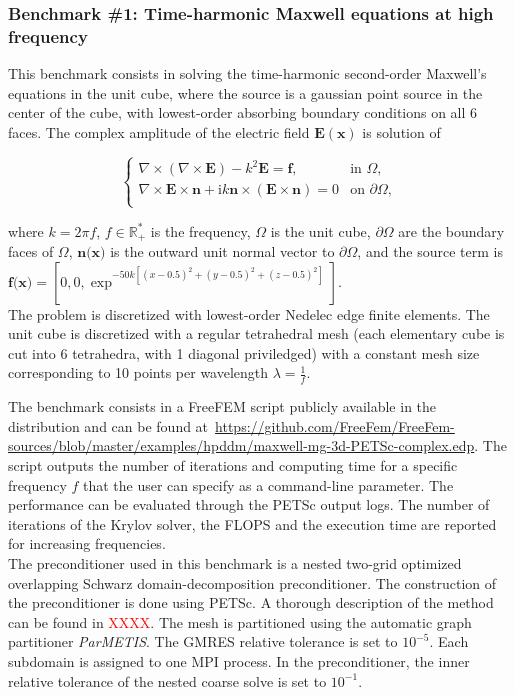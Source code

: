\subsubsection{Benchmark \#1: Time-harmonic Maxwell equations at high frequency}

This benchmark consists in solving the time-harmonic second-order Maxwell's equations in the unit cube, where the source is a gaussian point source in the center of the cube, with lowest-order absorbing boundary conditions on all 6 faces. The complex amplitude of the electric field $\mathbf{E(x)}$ is solution of

\begin{equation}
  \begin{cases}
\nabla\times(\nabla\times \mathbf{E})- k^2 \mathbf{E} = \mathbf{f}, & \text{in } \Omega,\\
\nabla\times \mathbf{E}\times \textbf{n}+ \mathrm{i} k \textbf{n} \times (\mathbf{E}\times \textbf{n}) = 0 & \text{on } \partial\Omega,\\
  \end{cases}
\end{equation}

where $k = 2\pi f$, $f \in \mathbb{R}^*_+$ is the frequency, $\Omega$ is the unit cube, $\partial\Omega$ are the boundary faces of $\Omega$, $\textbf{n(x)}$ is the outward unit normal vector to $\partial\Omega$, and the source term is $\textbf{f(x)} = [0,0,\exp^{-50 k [(x-0.5)^2 + (y-0.5)^2 + (z-0.5)^2]}]$.\\
The problem is discretized with lowest-order Nedelec edge finite elements. The unit cube is discretized with a regular tetrahedral mesh (each elementary cube is cut into 6 tetrahedra, with 1 diagonal priviledged) with a constant mesh size corresponding to 10 points per wavelength $\lambda = \frac{1}{f}$.


The benchmark consists in a FreeFEM script publicly available in the distribution and can be found at~\url{https://github.com/FreeFem/FreeFem-sources/blob/master/examples/hpddm/maxwell-mg-3d-PETSc-complex.edp}. The script outputs the number of iterations and computing time for a specific frequency $f$ that the user can specify as a command-line parameter. The performance can be evaluated through the PETSc output logs. The number of iterations of the Krylov solver, the FLOPS and the execution time are reported for increasing frequencies.\\

The preconditioner used in this benchmark is a nested two-grid optimized overlapping Schwarz domain-decomposition preconditioner. The construction of the preconditioner is done using PETSc. A thorough description of the method can be found in \textcolor{red}{XXXX}. The mesh is partitioned using the automatic graph partitioner \textit{ParMETIS}. The GMRES relative tolerance is set to $10^{-5}$. Each subdomain is assigned to one MPI process. In the preconditioner, the inner relative tolerance of the nested coarse solve is set to $10^{-1}$.

